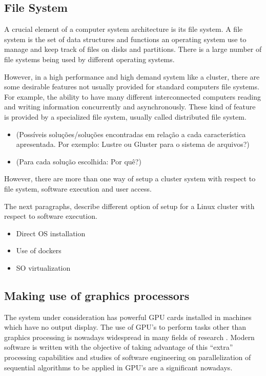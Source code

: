 \documentclass[twoside,a4paper,12pt,english]{inac17}
\begin{document}
\subsection{File System}

A crucial element of a computer system architecture is its file system. A file system is the set of data structures and functions an operating system
use to manage and keep track of files on disks and partitions. There is a large number of file systems being used by different operating systems\cite{linuxbook}.

However, in a high performance and high demand system like a cluster, there are some desirable features not usually provided for standard computers file systems.
For example, the ability to have many different interconnected computers reading and writing information concurrently and asynchronously. These kind of feature
is provided by a specialized file system, usually called distributed file system\cite{hal}.

\begin{itemize}

\item (Possíveis soluções/soluções encontradas em relação a cada característica apresentada. Por exemplo: Lustre \cite{Lustre} ou Gluster\cite{gluster} para o sistema de arquivos?)

\item (Para cada solução escolhida: Por quê?)
  
\end{itemize}

However, there are more than one way of setup a cluster system with respect
to file system, software execution and user access.

The next paragraphs, describe different option of setup for a Linux cluster with respect to software execution.

\begin{itemize}
\item Direct OS installation
\item Use of dockers
\item SO virtualization
\end{itemize}

\subsection{Making use of graphics processors}

The system under consideration has powerful GPU cards installed in machines
which have no output display. The use of GPU's to perform tasks other than graphics processing
is nowadays widespread in many fields of research \cite{UsoDeGpus}. Modern software is written with
the objective of taking advantage of this ``extra'' processing capabilities and studies of software
engineering on parallelization of sequential algorithms to be applied in GPU's are a significant
nowadays.
\end{document}
